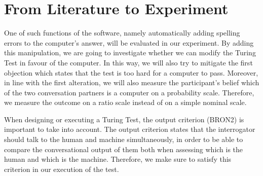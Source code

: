 \section{From Literature to Experiment}

One of such functions of the software, namely automatically adding spelling errors to the computer’s answer, will be evaluated in our experiment. By adding this manipulation, we are going to investigate whether we can modify the Turing Test in favour of the computer. In this way, we will also try to mitigate the first objection which states that the test is too hard for a computer to pass. Moreover, in line with the first alteration, we will also measure the participant’s belief which of the two conversation partners is a computer on a probability scale. Therefore, we measure the outcome on a ratio scale instead of on a simple nominal scale.

When designing or executing a Turing Test, the output criterion (BRON2) is important to take into account. The output criterion states that the interrogator should talk to the human and machine simultaneously, in order to be able to compare the conversational output of them both when assessing which is the human and which is the machine. Therefore, we make sure to satisfy this criterion in our execution of the test.
